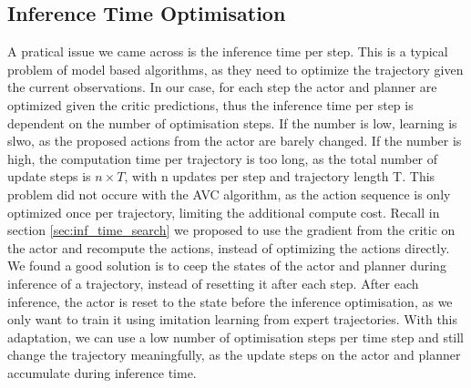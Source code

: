 \subsection{Inference Time Optimisation}
A pratical issue we came across is the inference time per step. This is a typical problem of model based algorithms, as they need to optimize the trajectory given 
the current observations. In our case, for each step the actor and planner are optimized given the critic predictions, thus the inference time 
per step is dependent on the number of optimisation steps. If the number is low, learning is slwo, as the proposed actions from the actor are barely changed. 
If the number is high, the computation time per trajectory is too long, as the total number of update steps is $n \times T$, with n updates per step and trajectory length 
T. This problem did not occure with the AVC algorithm, as the action sequence is only optimized 
once per trajectory, limiting the additional compute cost. Recall in section \ref{sec:inf_time_search} we proposed to use the gradient from the critic on the actor and recompute the 
actions, instead of optimizing the actions directly. We found a good solution is to ceep the states of the actor and planner during inference of a trajectory, 
instead of resetting it after each step. After each inference, the actor is reset to the state before the inference optimisation, as we only want to 
train it using imitation learning from expert trajectories. With this adaptation, we can use a low number of optimisation steps per time step and still change the trajectory meaningfully, 
as the update steps on the actor and planner accumulate during inference time.
     
